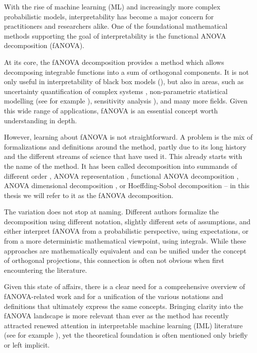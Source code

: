 With the rise of machine learning (ML) and increasingly more complex probabilistic models, interpretability has become a major concern for practitioners and researchers alike. One of the foundational mathematical methods supporting the goal of interpretability is the functional ANOVA decomposition (fANOVA).

At its core, the fANOVA decomposition provides a method which allows decomposing integrable functions into a sum of orthogonal components.
It is not only useful in interpretability of black box models (\cite{hooker2004, molnar2025}), but also in areas, such as uncertainty quantification of complex systems \cite{rahman2014}, non-parametric statistical modelling (see for example \cite{stone1997}), sensitivity analysis \cite{sobol1993sensitivity}), and many more fields.
Given this wide range of applications, fANOVA is an essential concept worth understanding in depth.\par

However, learning about fANOVA is not straightforward.
A problem is the mix of formalizations and definitions around the method, partly due to its long history and the different streams of science that have used it.
This already starts with the name of the method. It has been called decomposition into summands of different order \citep{sobol1993sensitivity}, ANOVA representation \citep{sobol2001}, functional ANOVA decomposition \citep{hooker2004}, ANOVA dimensional decomposition \citep{rahman2014}, or Hoeffding-Sobol decomposition \citep{chastaing2012} – in this thesis we will refer to it as the fANOVA decomposition.\par
The variation does not stop at naming. Different authors formalize the decomposition using different notation, slightly different sets of assumptions, and either interpret fANOVA from a probabilistic perspective, using expectations, or from a more deterministic mathematical viewpoint, using integrals.
While these approaches are mathematically equivalent and can be unified under the concept of orthogonal projections, this connection is often not obvious when first encountering the literature.\par


Given this state of affairs, there is a clear need for a comprehensive overview of fANOVA-related work and for a unification of the various notations and definitions that ultimately express the same concepts.
Bringing clarity into the fANOVA landscape is more relevant than ever as the method has recently attracted renewed attention in interpretable machine learning (IML) literature (see for example \cite{hu2025}), yet the theoretical foundation is often mentioned only briefly or left implicit.\par

